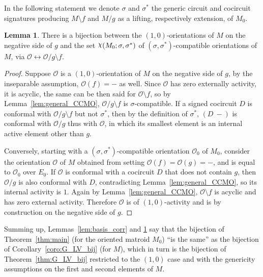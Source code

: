 \documentclass[12pt]{amsart}
\numberwithin{equation}{section}
\theoremstyle{definition}
\newtheorem{lemma}[theorem]{Lemma}
\newcommand{\Ocal}{{\mathcal O}}
\DeclareRobustCommand{\rchi}{{\mathpalette\irchi\relax}}
\newcommand{\irchi}[2]{\raisebox{\depth}{$#1\chi$}}
\begin{document}
In the following statement we denote $\sigma$ and $\sigma^*$ the generic circuit and cocircuit signatures producing $M\setminus f$ and $M/g$ as a lifting, respectively extension, of $M_0$.


\begin{lemma} \label{lem:orientation_corr}
There is a bijection between the $(1,0)$-orientations of $M$ on the negative side of $g$ and the set $\rchi(M_0;\sigma,\sigma^*)$ of $(\sigma,\sigma^*)$-compatible orientations of $M$, via $\Ocal\leftrightarrow\Ocal/g\setminus f$.
\end{lemma}

\begin{proof}
Suppose $\Ocal$ is a $(1,0)$-orientation of $M$ on the negative side of $g$, by the inseparable assumption, $\Ocal(f)=-$ as well.  Since $\Ocal$ has zero externally activity, it is acyclic, the same can be then said for $\Ocal\setminus f$, so by Lemma~\ref{lem:general_CCMO}, $\Ocal/g\setminus f$ is $\sigma$-compatible.
If a signed cocircuit $D$ is conformal with $\Ocal/g\setminus f$ but not $\sigma^*$, 
then by the definition of $\sigma^*$, $(D\ -)$ is conformal with $\Ocal/g$ thus with $\Ocal$, in which its smallest element is an internal active element other than $g$.

Conversely, starting with a $(\sigma,\sigma^*)$-compatible orientation $\Ocal_0$ of $M_0$, consider the orientation $\Ocal$ of $M$ obtained from setting $\Ocal(f)=\Ocal(g)=-$, and is equal to $\Ocal_0$ over $E_0$.
If $\Ocal$ is conformal with a cocircuit $D$ that does not contain $g$, then $\Ocal/g$ is also conformal with $D$, contradicting Lemma~\ref{lem:general_CCMO}, so its internal activity is $1$.
Again by Lemma~\ref{lem:general_CCMO}, $\Ocal\setminus f$ is acyclic and has zero external activity.
Therefore $\Ocal$ is of $(1,0)$-activity and is by construction on the negative side of $g$.
\end{proof}

Summing up, Lemmas~\ref{lem:basis_corr} and \ref{lem:orientation_corr} say that the bijection of Theorem~\ref{thm:main} (for the oriented matroid $M_0$) ``is the same'' as the bijection of Corollary~\ref{coro:G_LV_bij} (for $M$), which in turn is the bijection of Theorem~\ref{thm:G_LV_bij} restricted to the $(1,0)$ case and with the genericity assumptions on the first and second elements of $M$.
\end{document}
